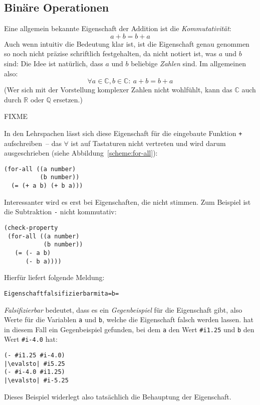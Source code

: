 \subsection{Binäre Operationen}
\label{sec:eigenschaften-binaere-operationen}

Eine allgemein bekannte Eigenschaft der Addition ist die
\textit{Kommutativität}:
%
\begin{displaymath}
a + b = b + a
\end{displaymath}
%
Auch wenn intuitiv die Bedeutung klar ist, ist  die Eigenschaft genau
genommen so noch nicht präzise schriftlich festgehalten, da nicht
notiert ist, was $a$ und $b$ sind: Die Idee ist natürlich,
dass $a$ und $b$ beliebige \emph{Zahlen} sind.  Im allgemeinen also:
%
\begin{displaymath}
\forall a \in \mathbb{C}, b \in \mathbb{C}:\ a + b = b + a 
\end{displaymath}
%
(Wer sich mit der Vorstellung komplexer Zahlen nicht wohlfühlt, kann
das $\mathbb{C}$ auch durch $\mathbb{R}$ oder $\mathbb{Q}$ ersetzen.)

FIXME

In den Lehrspachen lässt sich diese Eigenschaft für die eingebaute Funktion
\lstinline{+} aufschreiben~-- das $\forall$ ist auf
Tastaturen nicht vertreten und wird darum ausgeschrieben (siehe
Abbildung~\ref{scheme:for-all}):
%
\begin{lstlisting}
(for-all ((a number)
          (b number))
  (= (+ a b) (+ b a)))
\end{lstlisting}
%

Interessanter wird es erst bei Eigenschaften, die nicht stimmen.  Zum
Beispiel ist die Subtraktion \lstinline{-} nicht kommutativ:
%
\begin{lstlisting}
(check-property
 (for-all ((a number)
           (b number))
   (= (- a b)
      (- b a))))
\end{lstlisting}
%
Hierfür liefert \drscheme{} folgende Meldung:
%
\begin{alltt}
        Eigenschaft falsifizierbar mit a =  b = 
\end{alltt}
%
\textit{Falsifizierbar} bedeutet, dass es ein
\textit{Gegenbeispiel} für die Eigenschaft gibt,
also Werte für die Variablen \lstinline{a} und \lstinline{b}, welche die
Eigenschaft falsch werden lassen.  \drscheme{} hat in diesem Fall ein
Gegenbeispiel gefunden, bei dem \lstinline{a} den Wert \verb|#i1.25| und
\lstinline{b} den Wert \verb|#i-4.0| hat:
%
\begin{lstlisting}
(- #i1.25 #i-4.0)
|\evalsto| #i5.25
(- #i-4.0 #i1.25)
|\evalsto| #i-5.25
\end{lstlisting}
%
Dieses Beispiel widerlegt also tatsächlich die Behauptung der Eigenschaft.

